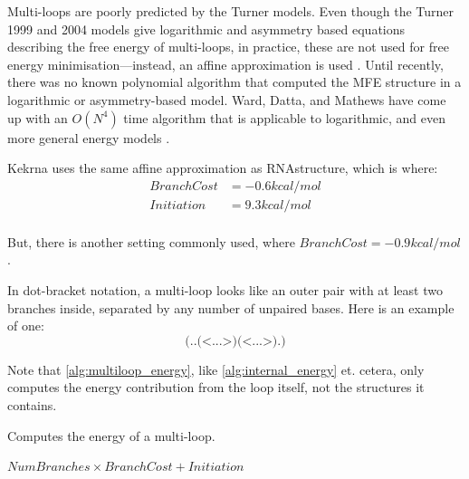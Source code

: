 \documentclass{cshonours}
\def\km{kcal/mol }
\begin{document}
Multi-loops are poorly predicted by the Turner models. Even though the Turner 1999 and 2004 models give logarithmic and asymmetry based equations describing the free energy of multi-loops, in practice, these are not used for free energy minimisation---instead, an affine approximation is used \cite{sankoffKruskal, mainville}. Until recently, there was no known polynomial algorithm that computed the MFE structure in a logarithmic or asymmetry-based model. Ward, Datta, and Mathews have come up with an $O(N^4)$ time algorithm that is applicable to logarithmic, and even more general energy models \cite{wardPersonal}.

Kekrna uses the same affine approximation as RNAstructure, which is where:
\begin{align*}
BranchCost &= -0.6 \km \\
Initiation &= 9.3 \km \\
\end{align*}

But, there is another setting commonly used, where $BranchCost = -0.9 \km$ \cite{t04}. 

In dot-bracket notation, a multi-loop looks like an outer pair with at least two branches inside, separated by any number of unpaired bases. Here is an example of one:
$$\texttt{(..(<...>)(<...>).)}$$

Note that \autoref{alg:multiloop_energy}, like \autoref{alg:internal_energy} et. cetera, only computes the energy contribution from the loop itself, not the structures it contains.

\begin{algorithm}[H]
\caption{Computes the energy of a multi-loop.}
\label{alg:multiloop_energy}
\begin{algorithmic}
\State \Return $NumBranches \times BranchCost + Initiation$
\EndFunction
\end{algorithmic}
\end{algorithm}
\end{document}
